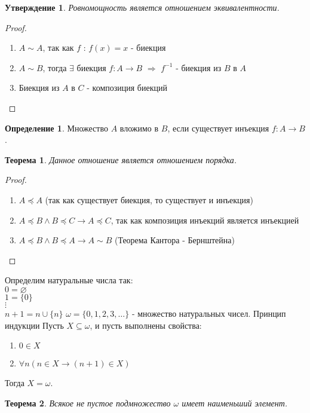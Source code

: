 \documentclass[a4paper, 12pt]{article}
\theoremstyle{definition}
\newtheorem*{definition}{Определение}
\theoremstyle{plain}
\newtheorem*{theorem}{Теорема}
\newtheorem*{subtheorem}{Утверждение}
\theoremstyle{remark}
\begin{document}
  \begin{subtheorem}
    Ровномощность является отношением эквивалентности.
  \end{subtheorem}
  \begin{proof}
    \begin{enumerate}
        \item $A\sim A$, так как $f$ : $f(x)=x$ - биекция
        \item $A\sim B$, тогда $\exists$ биекция $f:A\longrightarrow B$ $\Longrightarrow$ $f^{-1}$ - биекция из $B$ в $A$
        \item Биекция из $A$ в $C$ - композиция биекций
    \end{enumerate}
  \end{proof}
  \begin{definition}
    Множество $A$ вложимо в $B$, если существует инъекция $f:A\longrightarrow B$.
  \end{definition}
  \begin{theorem}
    Данное отношение является отношением порядка.
  \end{theorem}
  \begin{proof}
    \begin{enumerate}
        \item $A\preceq A$ (так как существует биекция, то существует и инъекция)
        \item $A\preceq B\wedge B\preceq C\to A\preceq C$, так как композиция инъекций является инъекцией
        \item $A\preceq B\wedge B\preceq A\to A\sim B$ (Теорема Кантора - Бернштейна)
    \end{enumerate}
  \end{proof}
  Определим натуральные числа так:\\
  $0=\varnothing$\\
  $1=\{0\}$\\
  $\vdots$\\
  $n+1=n\cup\{n\}$
  $\omega=\{0,1,2,3,\ldots\}$ - множество натуральных чисел.
  Принцип индукции
  Пусть $X\subseteq\omega$, и пусть выполнены свойства:
  \begin{enumerate}
    \item $0\in X$
    \item $\forall n(n\in X\to (n+1)\in X)$
  \end{enumerate}
  Тогда $X=\omega$.
  \begin{theorem}
    Всякое не пустое подмножество $\omega$ имеет наименьший элемент.
  \end{theorem}
\end{document}

